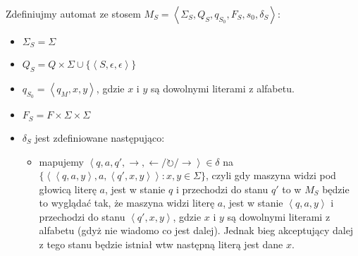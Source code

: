 \documentclass{article}
\theoremstyle{definition}
\theoremstyle{remark}
\begin{document}
Zdefiniujmy automat ze stosem \(M_S = \left<\Sigma_S, Q_S, q_{S_0}, F_S, s_0, \delta_S \right>\):
\begin{itemize}
\item \(\Sigma_S = \Sigma\)
\item \(Q_S = Q \times \Sigma \cup \{ \left< S, \epsilon, \epsilon \right> \} \)
\item \(q_{S_0} = \left< q_M, x, y \right>\), gdzie \(x\) i \(y\) są dowolnymi literami z alfabetu.
\item \(F_S = F \times \Sigma \times \Sigma\)
\item \(\delta_S\) jest zdefiniowane następująco:
\begin{itemize}
\item mapujemy \( \left<q, a, q', \rightarrow, \leftarrow / \circlearrowright / \rightarrow \right> \in \delta\) na \( \{ \left< \left<q,a,y\right>, a, \left<q',x,y\right> \right>: x,y \in \Sigma \} \),  
czyli gdy maszyna widzi pod głowicą literę \(a\), jest w stanie \(q\) i przechodzi do stanu \(q'\) to w \(M_S\) będzie to wyglądać tak, że maszyna widzi literę \(a\), jest w stanie \(\left<q,a,y\right>\) i przechodzi do stanu \(\left<q',x,y\right>\), gdzie \(x\) i \(y\) są dowolnymi literami z alfabetu (gdyż nie wiadomo co jest dalej). Jednak bieg akceptujący dalej z tego stanu będzie istniał wtw następną literą jest dane \(x\).


\end{itemize}
\end{itemize}
\end{document}
